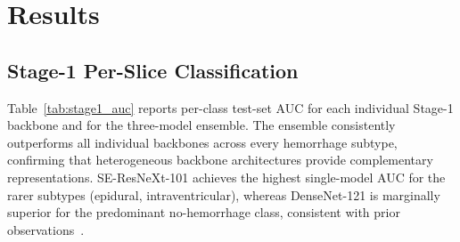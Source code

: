 \section{Results}
\label{sec:results}


\subsection{Stage-1 Per-Slice Classification}

Table~\ref{tab:stage1_auc} reports per-class test-set AUC for each
individual Stage-1 backbone and for the three-model ensemble.
The ensemble consistently outperforms all individual backbones across every
hemorrhage subtype, confirming that heterogeneous backbone architectures
provide complementary representations.
SE-ResNeXt-101 achieves the highest single-model AUC for the rarer subtypes
(epidural, intraventricular), whereas DenseNet-121 is marginally superior
for the predominant no-hemorrhage class, consistent with prior
observations~\cite{wang2021deeplearning}.

